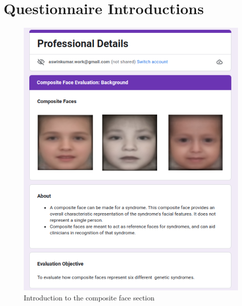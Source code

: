 \documentclass[../report.tex]{subfiles}
\begin{document}
	\chapter{Questionnaire Introductions}\label{ch_app_quest}
		{
	    \begin{figure}[H]
			\centering
			\includegraphics[scale=0.55]{images/quest/3.png}
			\caption{Introduction to the composite face section}
			\addtocounter{figure}{1}
			\label{fig_x}
		\end{figure}
		}
	
\end{document}
